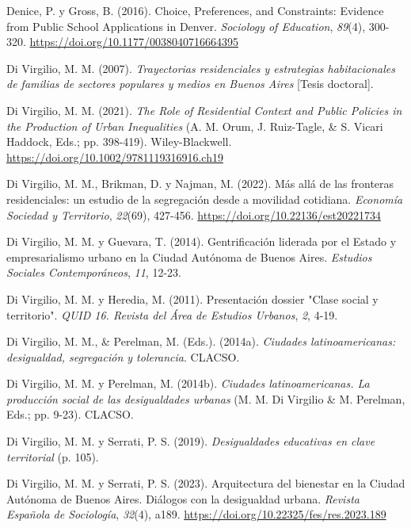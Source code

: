 \documentclass[
  spanish,
  a4paper,%
  chapterprefix=true,%
  DIV=calc,%
  twoside]{scrbook}%
\newlength{\cslhangindent}
\newenvironment{CSLReferences}[2] %
 {\begin{list}{}{%
  \setlength{\itemindent}{0pt}
  \setlength{\leftmargin}{0pt}
  \setlength{\parsep}{0pt}
  \ifodd #1
   \setlength{\leftmargin}{\cslhangindent}
   \setlength{\itemindent}{-1\cslhangindent}
  \fi
  \setlength{\itemsep}{#2\baselineskip}}}
 {\end{list}}
\begin{document}
\begin{CSLReferences}{1}{0}
Denice, P. y Gross, B. (2016). Choice, Preferences, and Constraints: Evidence from Public School Applications in Denver. \emph{Sociology of Education}, \emph{89}(4), 300-320. \url{https://doi.org/10.1177/0038040716664395}

Di Virgilio, M. M. (2007). \emph{Trayectorias residenciales y estrategias habitacionales de familias de sectores populares y medios en Buenos Aires} {[}Tesis doctoral{]}.

Di Virgilio, M. M. (2021). \emph{The Role of Residential Context and Public Policies in the Production of Urban Inequalities} (A. M. Orum, J. Ruiz-Tagle, \& S. Vicari Haddock, Eds.; pp. 398-419). Wiley-Blackwell. \url{https://doi.org/10.1002/9781119316916.ch19}

Di Virgilio, M. M., Brikman, D. y Najman, M. (2022). Más allá de las fronteras residenciales: un estudio de la segregación desde a movilidad cotidiana. \emph{Economía Sociedad y Territorio}, \emph{22}(69), 427-456. \url{https://doi.org/10.22136/est20221734}

Di Virgilio, M. M. y Guevara, T. (2014). Gentrificación liderada por el Estado y empresarialismo urbano en la Ciudad Autónoma de Buenos Aires. \emph{Estudios Sociales Contemporáneos}, \emph{11}, 12-23.

Di Virgilio, M. M. y Heredia, M. (2011). Presentación dossier {"}Clase social y territorio{"}. \emph{QUID 16. Revista del Área de Estudios Urbanos}, \emph{2}, 4-19.

Di Virgilio, M. M., \& Perelman, M. (Eds.). (2014a). \emph{Ciudades latinoamericanas: desigualdad, segregación y tolerancia}. CLACSO.

Di Virgilio, M. M. y Perelman, M. (2014b). \emph{Ciudades latinoamericanas. La producción social de las desigualdades urbanas} (M. M. Di Virgilio \& M. Perelman, Eds.; pp. 9-23). CLACSO.

Di Virgilio, M. M. y Serrati, P. S. (2019). \emph{Desigualdades educativas en clave territorial} (p. 105).

Di Virgilio, M. M. y Serrati, P. S. (2023). Arquitectura del bienestar en la Ciudad Autónoma de Buenos Aires. Diálogos con la desigualdad urbana. \emph{Revista Española de Sociología}, \emph{32}(4), a189. \url{https://doi.org/10.22325/fes/res.2023.189}


\end{CSLReferences}
\end{document}

